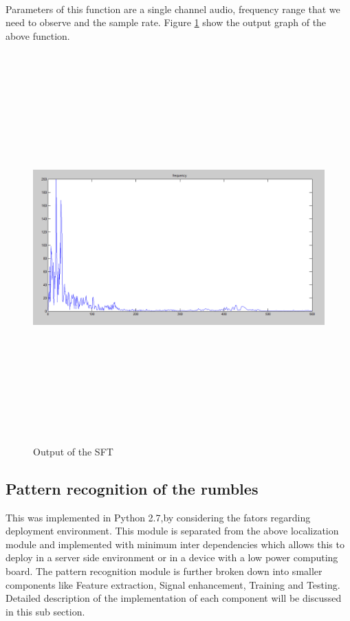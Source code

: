 \documentclass[12pt]{article}
\numberwithin{figure}{section}
\numberwithin{table}{section}
\begin{document}
\paragraph{}
Parameters of this function are a single channel audio, frequency range that we need to observe and the sample rate. Figure \ref{figure:sfft_output} show the output graph of the above function.

\begin{figure}[H]
\centering
\includegraphics[width=12cm,height=15cm,keepaspectratio]{sfft_output.png}
\caption{Output of the SFT}
\label{figure:sfft_output}
\end{figure}



\subsection{Pattern recognition of the rumbles}
This was implemented in Python 2.7,by considering the fators regarding deployment environment. This module is separated from the above localization module and implemented with minimum inter dependencies which allows this to deploy in a server side environment or in a device with a low power computing board. The pattern recognition module is further broken down into smaller components like Feature extraction, Signal enhancement, Training and Testing. Detailed description of the implementation of each component will be discussed in this sub section.  
\end{document}
